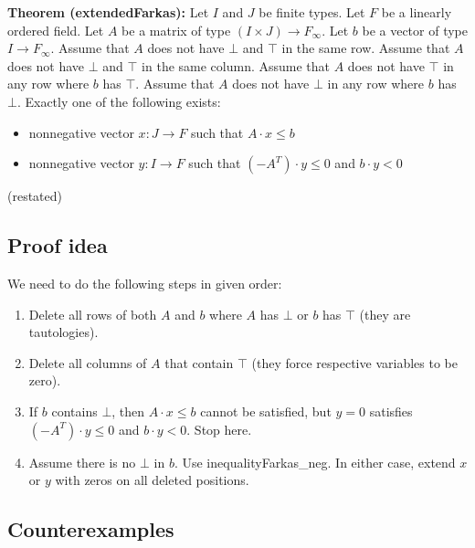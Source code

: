 \documentclass[]{article}
\renewcommand{\.}{\hskip .75pt}
\let\r=\rightarrow
\let\*=\cdot
\begin{document}
\medskip \noindent
\textbf{Theorem (extendedFarkas):}
Let $I$ and $J$ be finite types.
Let $F$ be a linearly ordered field.
Let $A$ be a matrix of type $(I \times J) \r F_\infty$.
Let $b$ be a vector of type $I \r F_\infty$.
Assume that $A$ does not have $\bot$ and $\top$ in the same row.
Assume that $A$ does not have $\bot$ and $\top$ in the same column.
Assume that $A$ does not have $\top$ in any row where $b$ has $\top$.
Assume that $A$ does not have $\bot$ in any row where $b$ has~$\bot$.
Exactly one of the following exists:
\begin{itemize}
\item nonnegative vector $x : J \r F$ such that $A \* x \le b$
\item nonnegative vector $y : I \r F$ such that $(-A^T) \* y \le 0$ and $b \* y < 0$
\end{itemize}
(restated)

\subsection{Proof idea}
We need to do the following steps in given order:
\begin{enumerate}
\item Delete all rows of both $A$ and $b$ where $A$ has $\bot$ or $b$ has $\top$
(they are tautologies).
\item Delete all columns of $A$ that contain $\top$
(they force respective variables to be zero).
\item If $b$ contains $\bot$, then $A \* x \le b$ cannot be satisfied,
but $y = 0$ satisfies $(-A^T) \* y \le 0$ and $b \* y < 0$. Stop here.
\item Assume there is no $\bot$ in $b$. Use inequalityFarkas\_neg.
In either case, extend $x$ or $y$ with zeros on all deleted positions.
\end{enumerate}

\subsection{Counterexamples}
\end{document}
